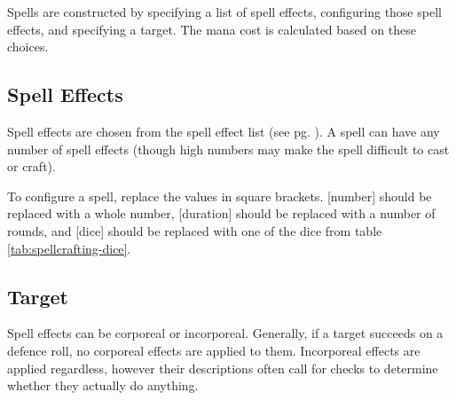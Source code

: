 \begin{multicols*}{2}
    Spells are constructed by specifying a list of spell effects, configuring
    those spell effects, and specifying a target. The mana cost is calculated
    based on these choices.

    \subsection{Spell Effects}
    Spell effects are chosen from the spell effect list (see pg.
    \pageref{spell-effect-list}). A spell can have any number of spell effects
    (though high numbers may make the spell difficult to cast or craft).

    To configure a spell, replace the values in square brackets. [number] should
    be replaced with a whole number, [duration] should be replaced with a number
    of rounds, and [dice] should be replaced with one of the dice from table
    \ref{tab:spellcrafting-dice}.


    \subsection{Target}
    Spell effects can be corporeal or incorporeal. Generally, if a target succeeds on a
    defence roll, no corporeal effects are applied to them. Incorporeal effects
    are applied regardless, however their descriptions often call for checks
    to determine whether they actually do anything.


\end{multicols*}
